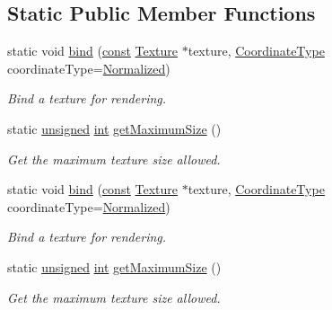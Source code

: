 \subsection*{Static Public Member Functions}
\begin{DoxyCompactItemize}
\item 
static void \hyperlink{classsf_1_1_texture_ae9a4274e7b95ebf7244d09c7445833b0}{bind} (\hyperlink{term__entry_8h_a57bd63ce7f9a353488880e3de6692d5a}{const} \hyperlink{classsf_1_1_texture}{Texture} $\ast$texture, \hyperlink{classsf_1_1_texture_aa6fd3bbe3c334b3c4428edfb2765a82e}{Coordinate\-Type} coordinate\-Type=\hyperlink{classsf_1_1_texture_aa6fd3bbe3c334b3c4428edfb2765a82ea3b684a2e0aa92c07a074864d0ea17f51}{Normalized})
\begin{DoxyCompactList}\small\item\em Bind a texture for rendering. \end{DoxyCompactList}\item 
static \hyperlink{curses_8priv_8h_aca40206900cfc164654362fa8d4ad1e6}{unsigned} \hyperlink{term__entry_8h_ad65b480f8c8270356b45a9890f6499ae}{int} \hyperlink{classsf_1_1_texture_a0bf905d487b104b758549c2e9e20a3fb}{get\-Maximum\-Size} ()
\begin{DoxyCompactList}\small\item\em Get the maximum texture size allowed. \end{DoxyCompactList}\item 
static void \hyperlink{classsf_1_1_texture_ae9a4274e7b95ebf7244d09c7445833b0}{bind} (\hyperlink{term__entry_8h_a57bd63ce7f9a353488880e3de6692d5a}{const} \hyperlink{classsf_1_1_texture}{Texture} $\ast$texture, \hyperlink{classsf_1_1_texture_aa6fd3bbe3c334b3c4428edfb2765a82e}{Coordinate\-Type} coordinate\-Type=\hyperlink{classsf_1_1_texture_aa6fd3bbe3c334b3c4428edfb2765a82ea3b684a2e0aa92c07a074864d0ea17f51}{Normalized})
\begin{DoxyCompactList}\small\item\em Bind a texture for rendering. \end{DoxyCompactList}\item 
static \hyperlink{curses_8priv_8h_aca40206900cfc164654362fa8d4ad1e6}{unsigned} \hyperlink{term__entry_8h_ad65b480f8c8270356b45a9890f6499ae}{int} \hyperlink{classsf_1_1_texture_a0bf905d487b104b758549c2e9e20a3fb}{get\-Maximum\-Size} ()
\begin{DoxyCompactList}\small\item\em Get the maximum texture size allowed. \end{DoxyCompactList}\end{DoxyCompactItemize}
